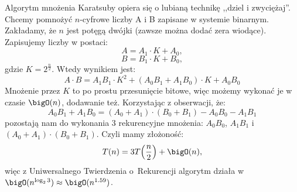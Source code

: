 Algorytm mnożenia Karatsuby opiera się o lubianą technikę ,,dziel i zwyciężaj''.
Chcemy pomnożyć \(n\)-cyfrowe liczby A i B zapisane w systemie binarnym. Zakładamy, że $n$ jest potęgą dwójki (zawsze można dodać zera wiodące). \\
Zapisujemy liczby w postaci:
\[
	A = A_1 \cdot K + A_0,
\]
\[
	B = B_1 \cdot K + B_0,
\]
gdzie \( K = 2^{\frac{n}{2}} \). Wtedy wynikiem jest:
\[
	A \cdot B = A_1 B_1 \cdot K^2 + (A_0 B_1 + A_1 B_0) \cdot K + A_0 B_0
\]
Mnożenie przez \( K \) to po prostu przesunięcie bitowe, więc możemy wykonać je w czasie \( \bigO(n) \), dodawanie też. Korzystając z obserwacji, że:
\[
	A_0 B_1 + A_1 B_0 = (A_0 + A_1) \cdot (B_0 + B_1) - A_0 B_0 - A_1 B_1
\]
pozostają nam do wykonania 3 rekurencyjne mnożenia: \( A_0 B_0 \), \( A_1 B_1 \) i \( (A_0 + A_1) \cdot (B_0 + B_1) \). \linebreak Czyli mamy złożoność:
\[ T(n) = 3T\pars{\frac{n}{2}} + \bigO(n), \]
więc z Uniwersalnego Twierdzenia o~Rekurencji algorytm działa w \( \bigO(n^{\log_2 3}) \approx \bigO(n^{1.59}) \).
